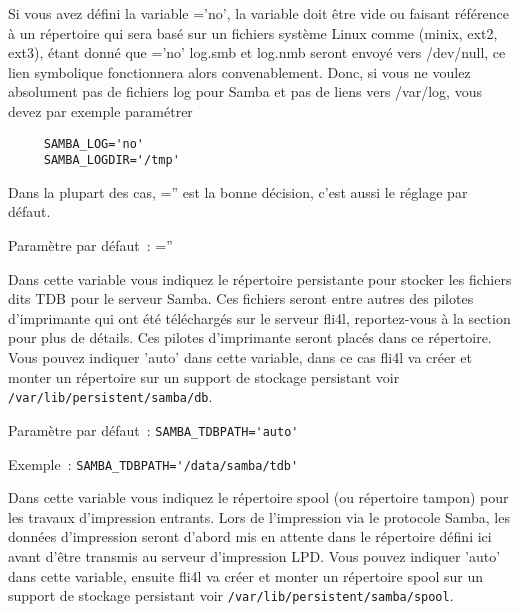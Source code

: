 \begin{description}
    Si vous avez défini la variable ='no',
    la variable  doit être vide ou faisant référence à un
    répertoire qui sera basé sur un fichiers système Linux comme (minix, ext2,
    ext3), étant donné que ='no' log.smb
    et log.nmb seront envoyé vers /dev/null, ce lien symbolique fonctionnera
    alors convenablement.
    Donc, si vous ne voulez absolument pas de fichiers log pour Samba et pas de
    liens vers /var/log, vous devez par exemple paramétrer

\begin{example}
\begin{verbatim}
     SAMBA_LOG='no'
     SAMBA_LOGDIR='/tmp'
\end{verbatim}
\end{example}

    Dans la plupart des cas, ='' est la bonne décision,
    c'est aussi le réglage par défaut.

    Paramètre par défaut~: =''



    Dans cette variable vous indiquez le répertoire persistante pour stocker
	les fichiers dits TDB pour le serveur Samba. Ces fichiers seront entre autres
	des pilotes d'imprimante qui ont été téléchargés sur le serveur fli4l, reportez-vous
	à la section  pour plus de
	détails. Ces  pilotes d'imprimante seront placés dans ce répertoire. Vous pouvez
	indiquer 'auto' dans cette variable, dans ce cas fli4l va créer et monter un
	répertoire sur un support de stockage persistant voir \texttt{/var/lib/persistent/samba/db}.

    Paramètre par défaut~: \verb+SAMBA_TDBPATH='auto'+

    Exemple~: \verb+SAMBA_TDBPATH='/data/samba/tdb'+



    Dans cette variable vous indiquez le répertoire spool (ou répertoire tampon) pour
	les travaux d'impression entrants. Lors de l'impression via le protocole Samba, les
	données d'impression seront d'abord mis en attente dans le répertoire défini ici avant
	d'être transmis au serveur d'impression LPD. Vous pouvez indiquer 'auto' dans cette
	variable, ensuite fli4l va créer et monter un répertoire spool sur un support de
	stockage persistant voir \texttt{/var/lib/persistent/samba/spool}.


\end{description}
